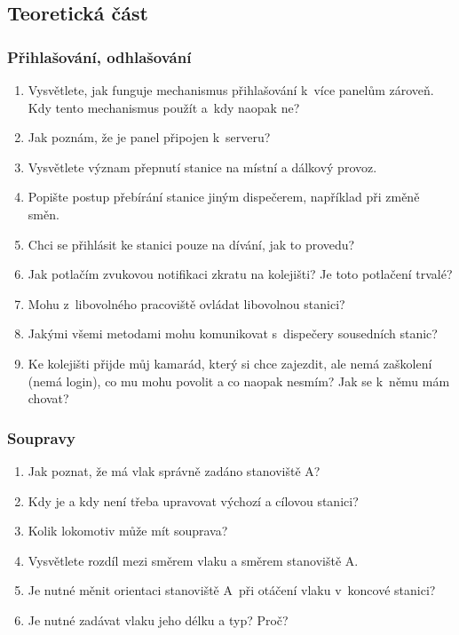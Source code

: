 \documentclass[12pt,a4paper]{article}
\begin{document}
\subsection{Teoretická část}

\subsubsection*{Přihlašování, odhlašování}
\begin{enumerate}[leftmargin=*]
\item Vysvětlete, jak funguje mechanismus přihlašování k~více panelům zároveň.
Kdy tento mechanismus použít a~kdy naopak ne?
\item Jak poznám, že je panel připojen k~serveru?
\item Vysvětlete význam přepnutí stanice na místní a dálkový provoz.
\item Popište postup přebírání stanice jiným dispečerem, například při změně
směn.
\item Chci se přihlásit ke stanici pouze na dívání, jak to provedu?
\item Jak potlačím zvukovou notifikaci zkratu na kolejišti? Je toto potlačení
trvalé?
\item Mohu z~libovolného pracoviště ovládat libovolnou stanici?
\item Jakými všemi metodami mohu komunikovat s~dispečery sousedních stanic?
\item Ke kolejišti přijde můj kamarád, který si chce zajezdit, ale nemá
zaškolení (nemá login), co mu mohu povolit a co naopak nesmím? Jak se k~němu
mám chovat?
\end{enumerate}

\subsubsection*{Soupravy}
\begin{enumerate}[leftmargin=*]
\item Jak poznat, že má vlak správně zadáno stanoviště A?
\item Kdy je a kdy není třeba upravovat výchozí a cílovou stanici?
\item Kolik lokomotiv může mít souprava?
\item Vysvětlete rozdíl mezi směrem vlaku a směrem stanoviště A.
\item Je nutné měnit orientaci stanoviště A~při otáčení vlaku v~koncové
stanici?
\item Je nutné zadávat vlaku jeho délku a typ? Proč?
\end{enumerate}
\end{document}
